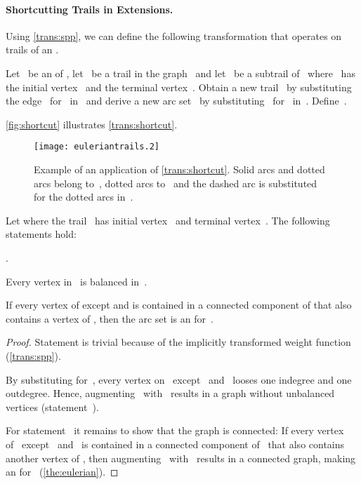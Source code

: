 \paragraph{Shortcutting Trails in \Eu Extensions.}Using \autoref{trans:spp}, we can define the following transformation that operates on trails of an \EE .\begin{transformation}\label{trans:shortcut}
  Let~ be an \EE{} of , let~ be a trail in the graph~ and let~ be a subtrail of~ where~ has the initial vertex~ and the terminal vertex~. Obtain a new trail~ by substituting the edge~ for~ in~ and derive a new arc set~ by substituting~ for~ in~. Define~.
\end{transformation}
\autoref{fig:shortcut} illustrates \autoref{trans:shortcut}.
\begin{figure}
  \begin{center}
    \texttt{[image: euleriantrails.2]}
    \caption{Example of an application of \autoref{trans:shortcut}. Solid arcs and dotted arcs belong to~, dotted arcs to~ and the dashed arc is substituted for the dotted arcs in~.}
    \label{fig:shortcut}
  \end{center}
\end{figure}
\begin{lemma}\label{lem:shortcut}
  Let  where the trail~ has initial vertex~ and terminal vertex~. The following statements hold:
  \begin{lemenum}
  \item . \label{enu:ls1}
  \item Every vertex in~ is balanced in~. \label{enu:ls4}
  \item If every vertex of  except  and  is contained in a connected component of  that also contains a vertex of , then the arc set  is an \EE{} for~. \label{enu:ls2}
\end{lemenum}
\end{lemma}
\begin{proof}
  Statement  is trivial because of the implicitly transformed weight function (\autoref{trans:spp}).
  
  By substituting  for~, every vertex on~ except~ and~ looses one indegree and one outdegree. Hence, augmenting~ with~ results in a graph without unbalanced vertices (statement~).

  For statement~ it remains to show that the graph  is connected: If every vertex of~ except~ and~ is contained in a connected component of~ that also contains another vertex of , then augmenting~ with~ results in a connected graph, making  an \EE{} for~ (\autoref{the:eulerian}).
\end{proof}
